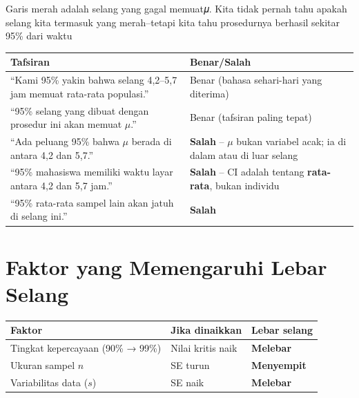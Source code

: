 \documentclass[
  indonesian,
  letterpaper,
]{book}
\newcounter{none} %
\begin{document}
Garis merah adalah selang yang gagal memuat𝜇. Kita tidak pernah tahu
apakah selang kita termasuk yang merah--tetapi kita tahu prosedurnya
berhasil sekitar 95\% dari waktu

{\def\LTcaptype{none} %
\begin{longtable}[]{@{}
  >{\raggedright\arraybackslash}p{}
  >{\centering\arraybackslash}p{}@{}}
\toprule\noalign{}
\begin{minipage}[b]{\linewidth}\raggedright
Tafsiran
\end{minipage} & \begin{minipage}[b]{\linewidth}\centering
Benar/Salah
\end{minipage} \\
\midrule\noalign{}
\endhead
\bottomrule\noalign{}
\endlastfoot
``Kami 95\% yakin bahwa selang 4,2--5,7 jam memuat rata-rata populasi.''
& Benar (bahasa sehari-hari yang diterima) \\
``95\% selang yang dibuat dengan prosedur ini akan memuat \(\mu\).'' &
Benar (tafsiran paling tepat) \\
``Ada peluang 95\% bahwa \(\mu\) berada di antara 4,2 dan 5,7.'' &
\textbf{Salah} -- \(\mu\) bukan variabel acak; ia di dalam atau di luar
selang \\
``95\% mahasiswa memiliki waktu layar antara 4,2 dan 5,7 jam.'' &
\textbf{Salah} -- CI adalah tentang \textbf{rata-rata}, bukan
individu \\
``95\% rata-rata sampel lain akan jatuh di selang ini.'' &
\textbf{Salah} \\
\end{longtable}
}

\section{Faktor yang Memengaruhi Lebar
Selang}\label{faktor-yang-memengaruhi-lebar-selang}

{\def\LTcaptype{none} %
\begin{longtable}[]{@{}lll@{}}
\toprule\noalign{}
Faktor & Jika dinaikkan & Lebar selang \\
\midrule\noalign{}
\endhead
\bottomrule\noalign{}
\endlastfoot
Tingkat kepercayaan (90\% → 99\%) & Nilai kritis naik &
\textbf{Melebar} \\
Ukuran sampel \(n\) & SE turun & \textbf{Menyempit} \\
Variabilitas data (\(s\)) & SE naik & \textbf{Melebar} \\
\end{longtable}
}
\end{document}
